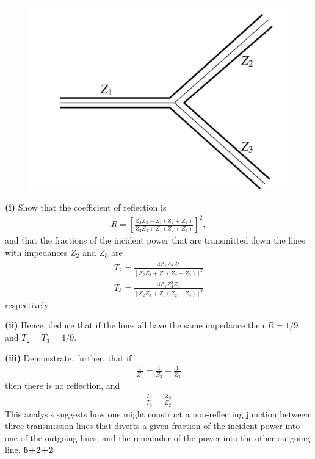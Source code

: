 \documentclass[12pt, a4paper]{article}
\begin{document}
\begin{figure}[h]
    \centering
    \includegraphics[scale=0.4]{figs/Transmission_lines.png}
    \caption{}
    \label{fig:Transmission_line}
\end{figure}

\textbf{(i)} Show that the coefficient of reflection is
\begin{align*}
    R = \left[\frac{Z_2 Z_3-Z_1 (Z_2+Z_3)}{Z_2 Z_3+Z_1 (Z_2+Z_3)}\right]^{2},
\end{align*}
and that the fractions of the incident power that are transmitted down the lines with impedances 
$Z_2$ and $Z_3$ are
\begin{align*}
    T_2= \frac{4 Z_1 Z_2 Z_3^{2}}{[Z_2 Z_3+Z_1 (Z_2+Z_3)]^{2}}\\	   
    T_3= \frac{4 Z_1 Z_2^{ 2} Z_3}{[Z_2 Z_3+Z_1 (Z_2+Z_3)]^{2}}	   
\end{align*}
respectively.

\textbf{(ii)} Hence, deduce that if the lines all have the same impedance then $R=1/9$ and 
$T_2=T_3=4/9$.

\textbf{(iii)} Demonstrate, further, that if
\begin{align*}
    \frac{1}{Z_1}=\frac{1}{Z_2}+\frac{1}{Z_3}
\end{align*}
then there is no reflection, and
\begin{align*}
    \frac{T_2}{T_3} = \frac{Z_3}{Z_2}
\end{align*}
This analysis suggests how one might construct a non-reflecting junction between three transmission 
lines that diverts a given fraction of the incident power into one of the outgoing lines, and the 
remainder of the power into the other outgoing line. \hfill\textbf{6+2+2}
\end{document}
